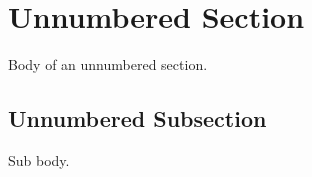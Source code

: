 \section*{Unnumbered Section}

Body of an unnumbered section.

\subsection*{Unnumbered Subsection}

Sub body.
